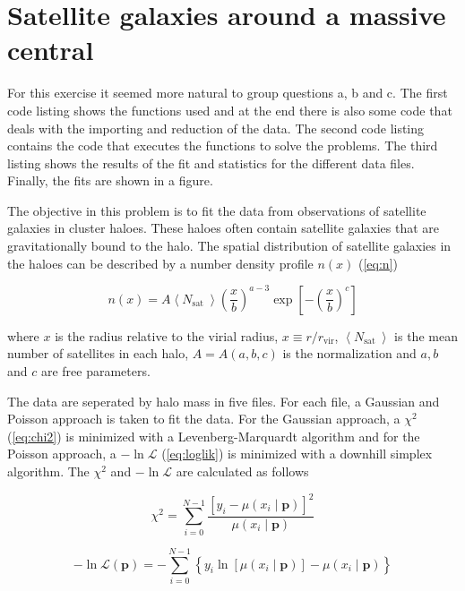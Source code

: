 \section{Satellite galaxies around a massive central}

For this exercise it seemed more natural to group questions a, b and c. The first code listing shows the functions used and at the end there is also some code that deals with the importing and reduction of the data. The second code listing contains the code that executes the functions to solve the problems. The third listing shows the results of the fit and statistics for the different data files. Finally, the fits are shown in a figure.

The objective in this problem is to fit the data from observations of satellite galaxies in cluster haloes. These haloes often contain satellite galaxies that are gravitationally bound to the halo. The spatial distribution of satellite galaxies in the haloes can be described by a number density profile $n(x)$ (\ref{eq:n})

\begin{equation}\label{eq:n}
n(x)=A\left\langle N_{\text {sat }}\right\rangle \left(\frac{x}{b}\right)^{a-3} \exp \left[-\left(\frac{x}{b}\right)^{c}\right]
\end{equation}
 
where $x$ is the radius relative to the virial radius, $x \equiv r / r_{\mathrm{vir}}$, $\left\langle N_{\text {sat }}\right\rangle$ is the mean number of satellites in each halo, $A=A(a, b, c)$ is the normalization and $a, b$ and $c$ are free parameters. 

The data are seperated by halo mass in five files. For each file, a Gaussian and Poisson approach is taken to fit the data. For the Gaussian approach, a $\chi^{2}$ (\ref{eq:chi2}) is minimized with a Levenberg-Marquardt algorithm and for the Poisson approach, a $-\ln \mathcal{L}$ (\ref{eq:loglik}) is minimized with a downhill simplex algorithm. The $\chi^{2}$ and $-\ln \mathcal{L}$ are calculated as follows

\begin{equation}\label{eq:chi2}
\chi^{2}=\sum_{i=0}^{N-1} \frac{\left[y_{i}-\mu\left(x_{i} \mid \mathbf{p}\right)\right]^{2}}{\mu\left(x_{i} \mid \mathbf{p}\right)}
\end{equation}

\begin{equation}\label{eq:loglik}
-\ln \mathcal{L}(\mathbf{p})=-\sum_{i=0}^{N-1}\left\{y_{i} \ln \left[\mu\left(x_{i} \mid \mathbf{p}\right)\right]-\mu\left(x_{i} \mid \mathbf{p}\right)\right\}
\end{equation}

